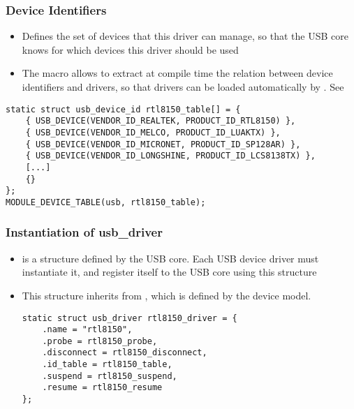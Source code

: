 \begin{frame}[fragile]
  \frametitle{Device Identifiers}
  \begin{itemize}
  \item Defines the set of devices that this driver can manage, so
    that the USB core knows for which devices this driver should be
    used
  \item The  macro allows  to
    extract at compile time the relation between device identifiers
    and drivers, so that drivers can be loaded automatically by
    . See 
  \end{itemize}
  \begin{block}{}
  \begin{verbatim}
static struct usb_device_id rtl8150_table[] = {
    { USB_DEVICE(VENDOR_ID_REALTEK, PRODUCT_ID_RTL8150) },
    { USB_DEVICE(VENDOR_ID_MELCO, PRODUCT_ID_LUAKTX) },
    { USB_DEVICE(VENDOR_ID_MICRONET, PRODUCT_ID_SP128AR) },
    { USB_DEVICE(VENDOR_ID_LONGSHINE, PRODUCT_ID_LCS8138TX) },
    [...]
    {}
};
MODULE_DEVICE_TABLE(usb, rtl8150_table);
  \end{verbatim}
  \end{block}
\end{frame}

\begin{frame}[fragile]
  \frametitle{Instantiation of usb\_driver}
  \begin{itemize}
  \item {} is a structure defined by the USB
    core. Each USB device driver must instantiate it, and register
    itself to the USB core using this structure
  \item This structure inherits from , which is defined
    by the device model.
    \begin{block}{}
  \begin{verbatim}
static struct usb_driver rtl8150_driver = {
    .name = "rtl8150",
    .probe = rtl8150_probe,
    .disconnect = rtl8150_disconnect,
    .id_table = rtl8150_table,
    .suspend = rtl8150_suspend,
    .resume = rtl8150_resume
};
  \end{verbatim}
  \end{block}
  \end{itemize}
\end{frame}

